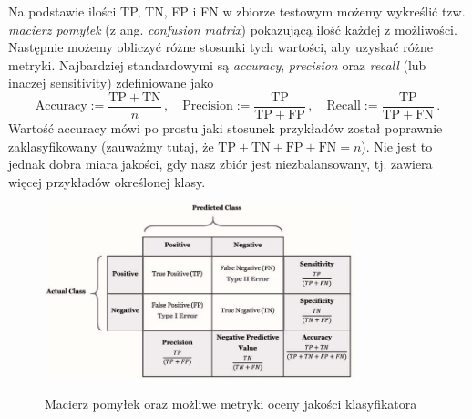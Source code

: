 \documentclass{myclass}
\numberwithin{equation}{subsection}
\begin{document}
Na podstawie ilości TP, TN, FP i FN w zbiorze testowym możemy wykreślić tzw. \emph{macierz pomyłek}
(z ang. \textit{confusion matrix}) pokazującą ilość każdej z możliwości. Następnie możemy obliczyć
różne stosunki tych wartości, aby uzyskać różne metryki. Najbardziej standardowymi są
\emph{accuracy}, \emph{precision} oraz \emph{recall} (lub inaczej sensitivity) zdefiniowane jako
\begin{equation}
    \mathrm{Accuracy} := \frac{\mathrm{TP} + \mathrm{TN}}{n}\,,\quad\mathrm{Precision} := \frac{\mathrm{TP}}{\mathrm{TP} + \mathrm{FP}}\,,\quad\mathrm{Recall} := \frac{\mathrm{TP}}{\mathrm{TP} + \mathrm{FN}}\,.
\end{equation}
Wartość accuracy mówi po prostu jaki stosunek przykładów został poprawnie zaklasyfikowany (zauważmy
tutaj, że \(\mathrm{TP + TN + FP + FN} = n\)). Nie jest to jednak dobra miara jakości, gdy nasz
zbiór jest niezbalansowany, tj. zawiera więcej przykładów określonej klasy.

\begin{figure}[ht]
    \centering
    \includegraphics[width=0.8\textwidth]{figs/confusionMatrix.jpg}
    \label{fig:confusionMatrix}
    \caption{Macierz pomyłek oraz możliwe metryki oceny jakości klasyfikatora}
\end{figure}
\end{document}
